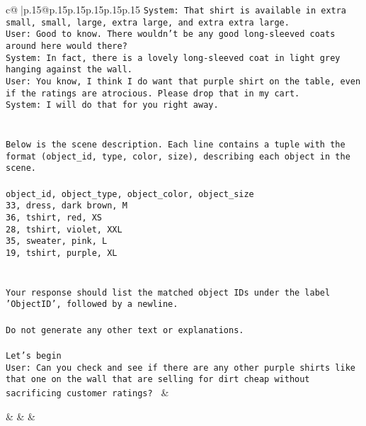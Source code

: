\documentclass{article}
\begin{document}
{\begin{supertabular}{c@{$\;$}|p{.15\linewidth}@{}p{.15\linewidth}p{.15\linewidth}p{.15\linewidth}p{.15\linewidth}p{.15\linewidth}}
{{{\tt System: That shirt is available in extra small, small, large, extra large, and extra extra large.\\ \tt User: Good to know. There wouldn't be any good long-sleeved coats around here would there?\\ \tt System: In fact, there is a lovely long-sleeved coat in light grey hanging against the wall.\\ \tt User: You know, I think I do want that purple shirt on the table, even if the ratings are atrocious. Please drop that in my cart.\\ \tt System: I will do that for you right away.\\ \tt \\ \tt \\ \tt Below is the scene description. Each line contains a tuple with the format (object_id, type, color, size), describing each object in the scene.\\ \tt \\ \tt object_id, object_type, object_color, object_size\\ \tt 33, dress, dark brown, M\\ \tt 36, tshirt, red, XS\\ \tt 28, tshirt, violet, XXL\\ \tt 35, sweater, pink, L\\ \tt 19, tshirt, purple, XL\\ \tt \\ \tt \\ \tt Your response should list the matched object IDs under the label 'ObjectID', followed by a newline.\\ \tt \\ \tt Do not generate any other text or explanations.\\ \tt \\ \tt Let's begin\\ \tt User: Can you check and see if there are any other purple shirts like that one on the wall that are selling for dirt cheap without sacrificing customer ratings? 
	  } 
	   } 
	   } 
	 & \\ 
 

    \theutterance {}  

    &  
	 & & \\ 
 

    \theutterance {}  


\end{supertabular}}
\end{document}
